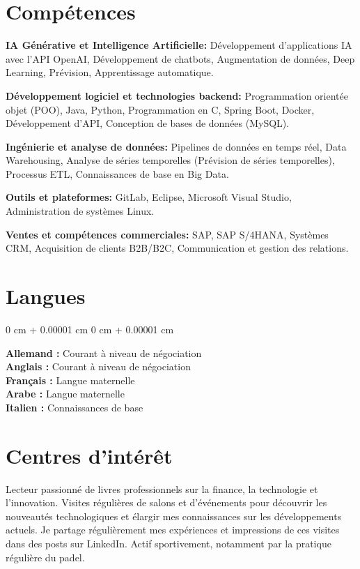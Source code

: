 \documentclass[10pt, letterpaper]{article}
\newenvironment{onecolentry}{
    \begin{adjustwidth}{
        0 cm + 0.00001 cm
    }{
        0 cm + 0.00001 cm
    }
}{
    \end{adjustwidth}
} %
\begin{document}
        
          

    
   

\section{Compétences}

\textbf{IA Générative et Intelligence Artificielle:}  
Développement d'applications IA avec l'API OpenAI, Développement de chatbots, Augmentation de données, Deep Learning, Prévision, Apprentissage automatique.



\textbf{Développement logiciel et technologies backend:}  
Programmation orientée objet (POO), Java, Python, Programmation en C, Spring Boot, Docker, Développement d'API, Conception de bases de données (MySQL).



\textbf{Ingénierie et analyse de données:}  
Pipelines de données en temps réel, Data Warehousing, Analyse de séries temporelles (Prévision de séries temporelles), Processus ETL, Connaissances de base en Big Data.



\textbf{Outils et plateformes:}  
GitLab, Eclipse, Microsoft Visual Studio, Administration de systèmes Linux.



\textbf{Ventes et compétences commerciales:}  
SAP, SAP S/4HANA, Systèmes CRM, Acquisition de clients B2B/B2C, Communication et gestion des relations.



    \section{Langues}

\begin{onecolentry}
    \textbf{Allemand :} Courant à niveau de négociation \\
    \textbf{Anglais :} Courant à niveau de négociation \\
    \textbf{Français :} Langue maternelle \\
    \textbf{Arabe :} Langue maternelle \\
    \textbf{Italien :} Connaissances de base
\end{onecolentry}


\section{Centres d'intérêt}

Lecteur passionné de livres professionnels sur la finance, la technologie et l'innovation.  
Visites régulières de salons et d'événements pour découvrir les nouveautés technologiques et élargir mes connaissances sur les développements actuels.  
Je partage régulièrement mes expériences et impressions de ces visites dans des posts sur LinkedIn.  
Actif sportivement, notamment par la pratique régulière du padel.

    
\end{document}
